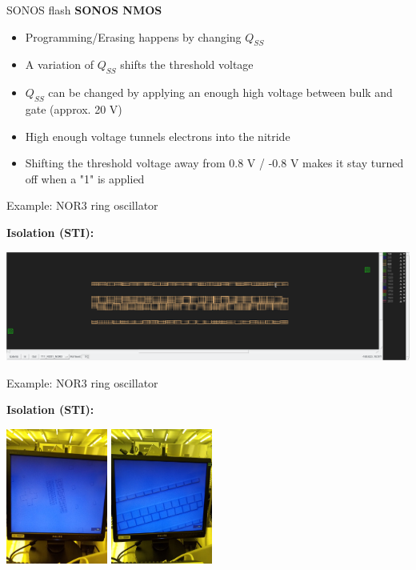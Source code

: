 \documentclass[aspectratio=169]{beamer}
\begin{document}
\begin{frame}{SONOS flash}
	\textbf{SONOS NMOS}

	\begin{itemize}
		\item Programming/Erasing happens by changing $Q_{SS}$
		\item A variation of $Q_{SS}$ shifts the threshold voltage
		\item $Q_{SS}$ can be changed by applying an enough high voltage between bulk and gate (approx. 20 V)
		\item High enough voltage tunnels electrons into the nitride
		\item Shifting the threshold voltage away from 0.8 V / -0.8 V makes it stay turned off when a "1" is applied
	\end{itemize}
\end{frame}

\begin{frame}{Example: NOR3 ring oscillator}
	\begin{center}
		\textbf{Isolation (STI):}

		\includegraphics[width=\textwidth]{images/Screenshot_20181220_164222.png}
	\end{center}
\end{frame}

\begin{frame}{Example: NOR3 ring oscillator}
\begin{center}
	\textbf{Isolation (STI):}

	\includegraphics[width=0.25\textwidth]{images/20181219_125354_Burst01.jpg}
	\includegraphics[width=0.25\textwidth]{images/20181219_125758.jpg}
\end{center}
\end{frame}
\end{document}
